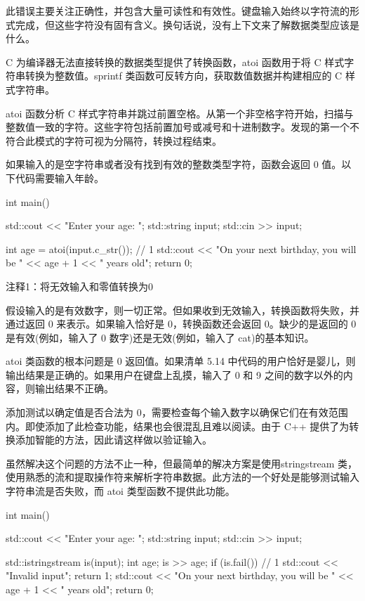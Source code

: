 此错误主要关注正确性，并包含大量可读性和有效性。键盘输入始终以字符流的形式完成，但这些字符没有固有含义。换句话说，没有上下文来了解数据类型应该是什么。

C 为编译器无法直接转换的数据类型提供了转换函数，atoi 函数用于将 C 样式字符串转换为整数值。sprintf 类函数可反转方向，获取数值数据并构建相应的 C 样式字符串。


atoi 函数分析 C 样式字符串并跳过前置空格。从第一个非空格字符开始，扫描与整数值一致的字符。这些字符包括前置加号或减号和十进制数字。发现的第一个不符合此模式的字符可视为分隔符，转换过程结束。

如果输入的是空字符串或者没有找到有效的整数类型字符，函数会返回 0 值。以下代码需要输入年龄。


\begin{cpp}
int main() {
  std::cout << "Enter your age: ";
  std::string input;
  std::cin >> input;

  int age = atoi(input.c_str()); // 1
  std::cout << "On your next birthday, you will be " << age + 1 << " years
  old\n";
  return 0;
}
\end{cpp}

{\footnotesize
注释1：将无效输入和零值转换为0
}

假设输入的是有效数字，则一切正常。但如果收到无效输入，转换函数将失败，并通过返回 0 来表示。如果输入恰好是 0，转换函数还会返回 0。缺少的是返回的 0 是有效(例如，输入了 0 数字)还是无效(例如，输入了 cat)的基本知识。


atoi 类函数的根本问题是 0 返回值。如果清单 5.14 中代码的用户恰好是婴儿，则输出结果是正确的。如果用户在键盘上乱摸，输入了 0 和 9 之间的数字以外的内容，则输出结果不正确。

添加测试以确定值是否合法为 0，需要检查每个输入数字以确保它们在有效范围内。即使添加了此检查功能，结果也会很混乱且难以阅读。由于 C++ 提供了为转换添加智能的方法，因此请这样做以验证输入。


虽然解决这个问题的方法不止一种，但最简单的解决方案是使用stringstream 类，使用熟悉的流和提取操作符来解析字符串数据。此方法的一个好处是能够测试输入字符串流是否失败，而 atoi 类型函数不提供此功能。


\begin{cpp}
int main() {
  std::cout << "Enter your age: ";
  std::string input;
  std::cin >> input;

  std::istringstream is(input);
  int age;
  is >> age;
  if (is.fail()) { // 1
    std::cout << "Invalid input\n";
    return 1;
  }
  std::cout << "On your next birthday, you will be " << age + 1 << " years old\n";
  return 0;
}
\end{cpp}

